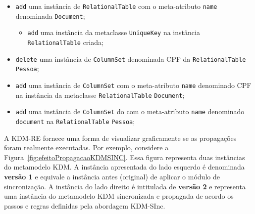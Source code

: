 \begin{itemize}
    \item \texttt{add} uma instância de \texttt{RelationalTable} com o meta-atributo \texttt{name} denominada \texttt{Document};
    
    \begin{itemize}
        \item \texttt{add} uma instância da metaclasse \texttt{UniqueKey} na instância \texttt{RelationalTable} criada;
    \end{itemize}
    
    \item \texttt{delete} uma instância de \texttt{ColumnSet} denominada CPF da \texttt{RelationalTable} \texttt{Pessoa};
    
    \item \texttt{add} uma instância de \texttt{ColumnSet} com o meta-atributo \texttt{name} denominado CPF na instância da metaclasse \texttt{RelationalTable} \texttt{Document};
    
    \item \texttt{add} uma instância de \texttt{ColumnSet} do com o meta-atributo \texttt{name} denominado \texttt{document} na \texttt{RelationalTable} \texttt{Pessoa};

    
\end{itemize}

A KDM-RE fornece uma forma de visualizar graficamente se as propagações foram realmente executadas. Por exemplo, considere a Figura~\ref{fig:efeitoPropagacaoKDMSINC}. Essa figura representa duas instâncias do metamodelo KDM. A instância apresentada do lado esquerdo é denominada \textbf{versão 1} e equivale a instância antes (original) de aplicar o módulo de sincronização. A instância do lado direito é intitulada de \textbf{versão 2} e representa uma instância do metamodelo KDM sincronizada e propagada de acordo os passos e regras definidas pela abordagem KDM-SInc.%


